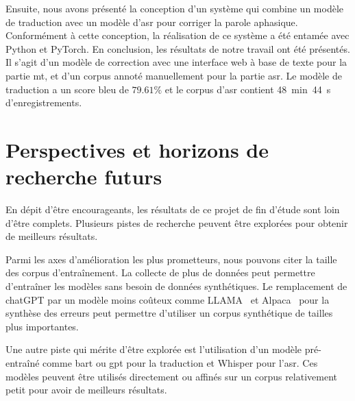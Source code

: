 Ensuite, nous avons présenté la conception d'un système 
qui combine un modèle de traduction avec un modèle d'\gls{asr} pour corriger la parole aphasique.
Conformément à cette conception, la réalisation de ce système a été entamée avec Python et PyTorch.
En conclusion, les résultats de notre travail ont été présentés.
Il s'agit d'un modèle de correction avec une interface web à base de texte pour la partie \gls{mt},
et d'un corpus annoté manuellement pour la partie \gls{asr}.
Le modèle de traduction a un score \gls{bleu} de \(79.61\%\) 
et le corpus d'\gls{asr} contient 48~min~44~s d'enregistrements.

\section*{Perspectives et horizons de recherche futurs}

En dépit d'être encourageants, les résultats de ce projet de fin d'étude sont loin d'être complets.
Plusieurs pistes de recherche peuvent être explorées pour obtenir de meilleurs résultats.

Parmi les axes d'amélioration les plus prometteurs, nous pouvons citer la taille des corpus d'entraînement.
La collecte de plus de données peut permettre d'entraîner les modèles sans besoin de données synthétiques.
Le remplacement de chatGPT par un modèle moins coûteux comme LLAMA~\cite{Touvron_et.al_2023}
et Alpaca~\cite{Zhang_Han_Zhou_Hu_Yan_Lu_Li_Gao_Qiao_2023}
pour la synthèse des erreurs peut permettre d'utiliser un corpus synthétique de tailles plus importantes.

Une autre piste qui mérite d'être explorée est l'utilisation d'un modèle pré-entraîné comme \gls{bart} ou \gls{gpt}
pour la traduction et Whisper pour l'\gls{asr}.
Ces modèles peuvent être utilisés directement 
ou affinés sur un corpus relativement petit pour avoir de meilleurs résultats. 
